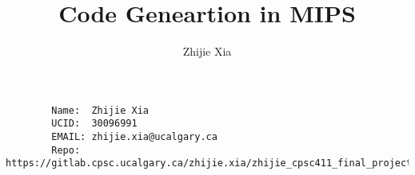 \documentclass[12pt]{article}
\author{Zhijie Xia}
\title{Code Geneartion in MIPS}
\begin{document}
\maketitle

\begin{verbatim}
        Name:  Zhijie Xia
        UCID:  30096991
        EMAIL: zhijie.xia@ucalgary.ca
        Repo: https://gitlab.cpsc.ucalgary.ca/zhijie.xia/zhijie_cpsc411_final_project
\end{verbatim}
\end{document}
